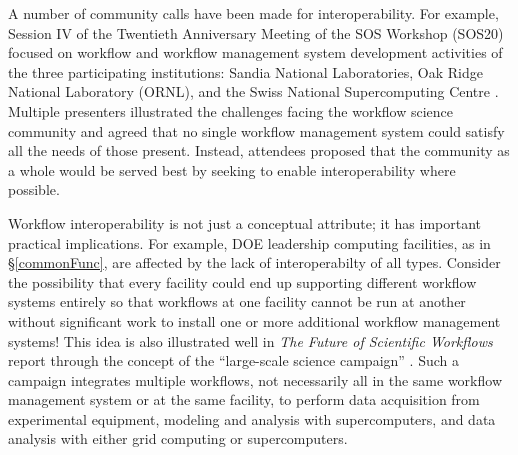 A number of community calls have been made for interoperability. For example,
Session IV of the Twentieth Anniversary Meeting of the SOS Workshop (SOS20)
focused on workflow and workflow management system development activities of
the three participating institutions: Sandia National Laboratories, Oak Ridge
National Laboratory (ORNL), and the Swiss National Supercomputing Centre
\cite{pack_sos20_2016}. Multiple presenters illustrated the challenges facing
the workflow science community and agreed that no single workflow
management system could satisfy all the needs of those present. Instead,
attendees proposed that the community as a whole would be served best by
seeking to enable interoperability where possible.

Workflow interoperability is not just a conceptual attribute; it has
important practical implications. For example, DOE leadership computing
facilities, as in \S\ref{commonFunc}, are affected by the lack of
interoperabilty of all types. Consider the possibility that every facility
could end up supporting different workflow systems entirely so that workflows
at one facility cannot be run at another without significant work to install
one or more additional workflow management systems! This idea is also
illustrated well in \textit{The Future of Scientific Workflows} report through
the concept of the ``large-scale science campaign'' \cite{deelman_future_2015}.
Such a campaign integrates multiple workflows, not necessarily all in the same
workflow management system or at the same facility, to perform data
acquisition from experimental equipment, modeling and analysis with
supercomputers, and data analysis with either grid computing or
supercomputers.